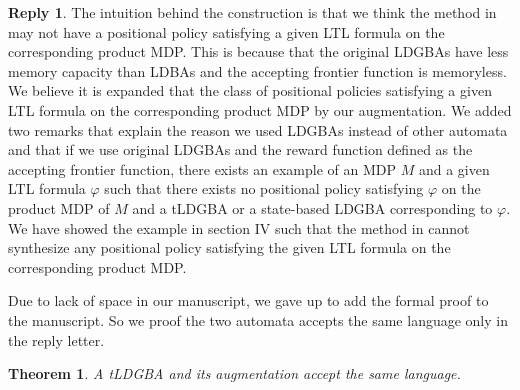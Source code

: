 \documentclass[10 pt, dvipdfmx]{article}
\newtheorem{theorem}{Theorem}
\theoremstyle{definition}
\newtheorem{review point}{Review Point}[section]
\newtheorem*{reply}{Reply}
\begin{document}
\begin{reply}
  The intuition behind the construction is that we think the method in \cite{HAK2019} may not have a positional policy satisfying a given LTL formula on the corresponding product MDP.
  This is because that the original LDGBAs have less memory capacity than LDBAs and the accepting frontier function is memoryless. We believe it is expanded that the class of positional policies satisfying a given LTL formula on the corresponding product MDP by our augmentation. We added two remarks that explain the reason we used LDGBAs instead of other automata and that if we use original LDGBAs and the reward function defined as the accepting frontier function, there exists an example of an MDP $M$ and a given LTL formula $\varphi$ such that there exists no positional policy satisfying $\varphi$ on the product MDP of $M$ and a tLDGBA or a state-based LDGBA corresponding to $\varphi$. We have showed the example in section IV such that the method in \cite{HAK2019} cannot synthesize any positional policy satisfying the given LTL formula on the corresponding product MDP.

  Due to lack of space in our manuscript, we gave up to add the formal proof to the manuscript. So we proof the two automata accepts the same language only in the reply letter.

  \begin{theorem}
    A tLDGBA and its augmentation accept the same language.
  \end{theorem}


\end{reply}
\end{document}
